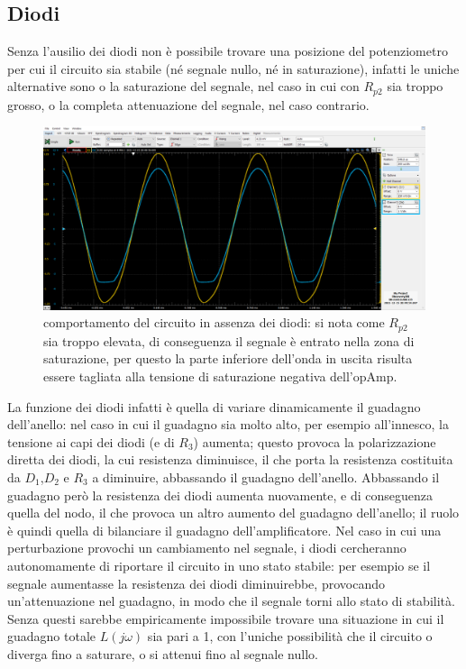 \documentclass[10pt, a4paper, italian]{article}
\begin{document}
\subsection{Diodi}
Senza l'ausilio dei diodi non è possibile trovare una posizione del potenziometro per cui il circuito sia stabile (né segnale nullo, né in saturazione), infatti le uniche alternative sono o la saturazione del segnale, nel caso in cui con $R_{p2}$ sia troppo grosso, o la completa attenuazione del segnale, nel caso contrario.
\begin{figure}[H]
    \centering
	\includegraphics[scale=0.4]{senzadiodi}
    \caption{comportamento del circuito in assenza dei diodi: si nota come $R_{p2}$ sia troppo elevata, di conseguenza il segnale è entrato nella zona di saturazione, per questo la parte inferiore dell'onda in uscita risulta essere tagliata alla tensione di saturazione negativa dell'opAmp.
    \label{fig: Draft1}}
\end{figure}
La funzione dei diodi infatti è quella di variare dinamicamente il guadagno dell'anello: nel caso in cui il guadagno sia molto alto, per esempio all'innesco, la tensione ai capi dei diodi (e di $R_3$) aumenta; questo provoca la polarizzazione diretta dei diodi, la cui resistenza diminuisce, il che porta la resistenza costituita da $D_1$,$D_2$ e $R_3$ a diminuire, abbassando il guadagno dell'anello. Abbassando il guadagno però la resistenza dei diodi aumenta nuovamente, e di conseguenza quella del nodo, il che provoca un altro aumento del guadagno dell'anello; il ruolo è quindi quella di bilanciare il guadagno dell'amplificatore.
Nel caso in cui una perturbazione provochi un cambiamento nel segnale, i diodi cercheranno autonomamente di riportare il circuito in uno stato stabile: per esempio se il segnale aumentasse la resistenza dei diodi diminuirebbe, provocando un'attenuazione nel guadagno, in modo che il segnale torni allo stato di stabilità.
Senza questi sarebbe empiricamente impossibile trovare una situazione in cui il guadagno totale $L(j\omega) $ sia pari a 1, con l'uniche possibilità che il circuito o diverga fino a saturare, o si attenui fino al segnale nullo.
\end{document}
